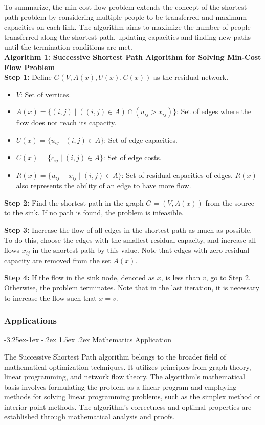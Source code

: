 \documentclass[a4paper]{article}
\makeatletter
\newcounter {subsubsubsection}[subsubsection]
\newcommand\subsubsubsection{\@startsection{subsubsubsection}{4}{\z@}%
	{-3.25ex\@plus -1ex \@minus -.2ex}%
	{1.5ex \@plus .2ex}%
	{\normalfont\normalsize\bfseries}}
\makeatother
\begin{document}
		To summarize, the min-cost flow problem extends the concept of the shortest path problem by considering multiple people to be transferred and maximum capacities on each link. The algorithm aims to maximize the number of people transferred along the shortest path, updating capacities and finding new paths until the termination conditions are met.\\
		\textbf{Algorithm 1: Successive Shortest Path Algorithm for Solving Min-Cost Flow Problem} \\
		\textbf{Step 1:} Define \(G(V, A(x), U(x), C(x))\) as the residual network.
		\begin{itemize}
			\item \(V\): Set of vertices.
			\item \(A(x) = \{(i, j) \mid ((i, j) \in A) \cap (u_{ij} > x_{ij})\}\): Set of edges where the flow does not reach its capacity.
			\item \(U(x) = \{u_{ij} \mid (i, j) \in A\}\): Set of edge capacities.
			\item \(C(x) = \{c_{ij} \mid (i, j) \in A\}\): Set of edge costs.
			\item \(R(x) = \{u_{ij} - x_{ij} \mid (i, j) \in A\}\): Set of residual capacities of edges. \(R(x)\) also represents the ability of an edge to have more flow.
		\end{itemize}
		
		\textbf{Step 2:} Find the shortest path in the graph \(G = (V, A(x))\) from the source to the sink. If no path is found, the problem is infeasible.
		
		\textbf{Step 3:} Increase the flow of all edges in the shortest path as much as possible. To do this, choose the edges with the smallest residual capacity, and increase all flows \(x_{ij}\) in the shortest path by this value. Note that edges with zero residual capacity are removed from the set \(A(x)\).
		
		\textbf{Step 4:} If the flow in the sink node, denoted as \(x\), is less than \(v\), go to Step 2. Otherwise, the problem terminates. Note that in the last iteration, it is necessary to increase the flow such that \(x = v\).
		
		\subsubsection{Applications}
		
		\subsubsubsection{Mathematics Application}
		
		The Successive Shortest Path algorithm belongs to the broader field of mathematical optimization techniques. It utilizes principles from graph theory, linear programming, and network flow theory. The algorithm's mathematical basis involves formulating the problem as a linear program and employing methods for solving linear programming problems, such as the simplex method or interior point methods. The algorithm's correctness and optimal properties are established through mathematical analysis and proofs.
		
\end{document}
